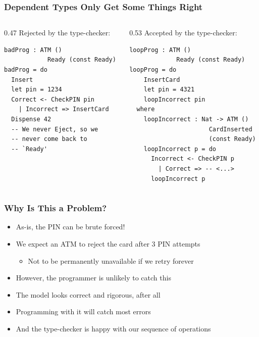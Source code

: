 \documentclass[compress,handout]{beamer}
\begin{document}
\begin{frame}[fragile]
  \frametitle{Dependent Types Only Get Some Things Right}

  \begin{columns}
  \begin{column}{0.47\framewidth}
    {\color{red} Rejected by the type-checker:}
    \vspace*{1mm}
    \begin{verbatim}
badProg : ATM ()
            Ready (const Ready)
badProg = do
  Insert
  let pin = 1234
  Correct <- CheckPIN pin
    | Incorrect => InsertCard
  Dispense 42
  -- We never Eject, so we
  -- never come back to
  -- `Ready'
    \end{verbatim}
    \vspace*{2.5mm}
  \end{column}

  \pause  %

  \vrule{}

  \begin{column}{0.53\framewidth}
    {\color{orange} Accepted by the type-checker:}
    \vspace*{1mm}
    \begin{verbatim}
loopProg : ATM ()
             Ready (const Ready)
loopProg = do
    InsertCard
    let pin = 4321
    loopIncorrect pin
  where
    loopIncorrect : Nat -> ATM ()
                      CardInserted
                      (const Ready)
    loopIncorrect p = do
      Incorrect <- CheckPIN p
        | Correct => -- <...>
      loopIncorrect p
    \end{verbatim}
    \vspace*{-6mm}
  \end{column}
  \end{columns}
\end{frame}


\begin{frame}
  \frametitle{Why Is This a Problem?}

  \begin{itemize}
    \item<1-> As-is, the PIN can be brute forced!
    \item<2-> We expect an ATM to reject the card after 3 PIN attempts
    \begin{itemize}
      \item<2-> Not to be permanently unavailable if we retry forever
    \end{itemize}
    \item<3-> However, the programmer is unlikely to catch this
    \item<4-> The model looks correct and rigorous, after all
    \item<5-> Programming with it will catch most errors
    \item<6-> And the type-checker is happy with our sequence of operations
  \end{itemize}
\end{frame}
\end{document}
